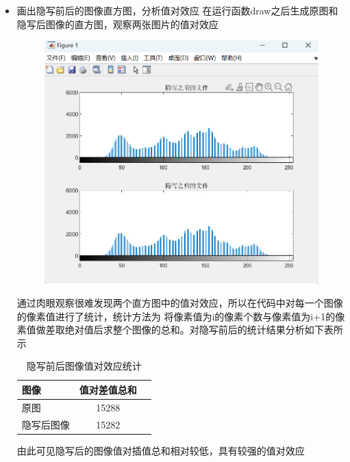 \documentclass[a4paper,11pt,UTF8]{ctexart}
\newcommand{\bottomcaption}{%
\setlength{\abovecaptionskip}{6pt}%
\setlength{\belowcaptionskip}{6pt}%
\caption}
\newcommand{\xiaowuhao}{\fontsize{9pt}{\baselineskip}\selectfont}   %
\begin{document}
\begin{itemize}
\newpage
      \item 画出隐写前后的图像直方图，分析值对效应
        在运行函数draw之后生成原图和隐写后图像的直方图，观察两张图片的值对效应\par
        \begin{figure}[!htbp]
        \centering
        \includegraphics[width=\textwidth]{LSB_draw.png}
        \bottomcaption{\xiaowuhao{隐写前后图像直方图}}
        \end{figure}
        通过肉眼观察很难发现两个直方图中的值对效应，所以在代码中对每一个图像的像素值进行了统计，统计方法为
        将像素值为i的像素个数与像素值为i+1的像素值做差取绝对值后求整个图像的总和。对隐写前后的统计结果分析如下表所示\par
        \begin{table}[!h!tbp]
          \caption{隐写前后图像值对效应统计}\label{tab1}
            \centering
          \begin{tabular*}{0.75\textwidth}{@{\extracolsep{\fill}}lcc}
              \toprule
              图像          &值对差值总和                \\
              \midrule
              原图              &15288         \\
              隐写后图像        &15282        \\
              \bottomrule
          \end{tabular*}
        \end{table}
        由此可见隐写后的图像值对插值总和相对较低，具有较强的值对效应
    \end{itemize}
\end{document}
